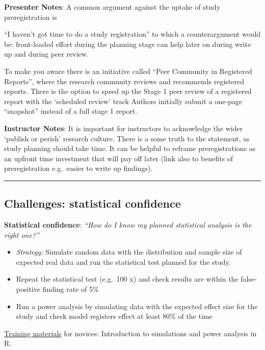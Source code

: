 \documentclass[
  letterpaper,
  DIV=11,
  numbers=noendperiod]{scrartcl}
\providecommand{\tightlist}{%
  \setlength{\itemsep}{0pt}\setlength{\parskip}{0pt}}
\begin{document}
\textbf{Presenter Notes}: A common argument against the uptake of study
preregistration is

``I haven't got time to do a study registration'' to which a
counterargument would be: front-loaded effort during the planning stage
can help later on during write up and during peer review.

To make you aware there is an initiative called ``Peer Community in
Registered Reports'', where the research community reviews and
recommends registered reports. There is the option to speed up the Stage
1 peer review of a registered report with the `scheduled review' track
Authors initially submit a one-page ``snapshot'' instead of a full stage
1 report.

\textbf{Instructor Notes}: It is important for instructors to
acknowledge the wider `publish or perish' research culture. There is a
some truth to the statement, as study planning should take time. It can
be helpful to reframe preregistrations as an upfront time investment
that will pay off later (link also to benefits of preregistration
e.g.~easier to write up findings).

\begin{center}\rule{0.5\linewidth}{0.5pt}\end{center}

\subsection{Challenges: statistical
confidence}\label{challenges-statistical-confidence}

\textbf{Statistical confidence}: \emph{``How do I know my planned
statistical analysis is the right one?''}

\begin{itemize}
\tightlist
\item
  \emph{Strategy:} Simulate random data with the distribution and sample
  size of expected real data and run the statistical test planned for
  the study.
\item
  Repeat the statistical test (e.g.~100 x) and check results are within
  the false-positive finding rate of 5\%
\item
  Run a power analysis by simulating data with the expected effect size
  for the study and check model registers effect at least 80\% of the
  time
\end{itemize}

\begin{tcolorbox}[enhanced jigsaw, arc=.35mm, bottomrule=.15mm, bottomtitle=1mm, breakable, colback=white, colbacktitle=quarto-callout-note-color!10!white, colframe=quarto-callout-note-color-frame, coltitle=black, left=2mm, leftrule=.75mm, opacityback=0, opacitybacktitle=0.6, rightrule=.15mm, title=\textcolor{quarto-callout-note-color}{\faInfo}\hspace{0.5em}{Additional resource}, titlerule=0mm, toprule=.15mm, toptitle=1mm]

\href{https://lmu-osc.github.io/teaching-material-for-novices/open-research-tools/simulations/}{Training
materials} for novices: Introduction to simulations and power analysis
in R.

\end{tcolorbox}
\end{document}
